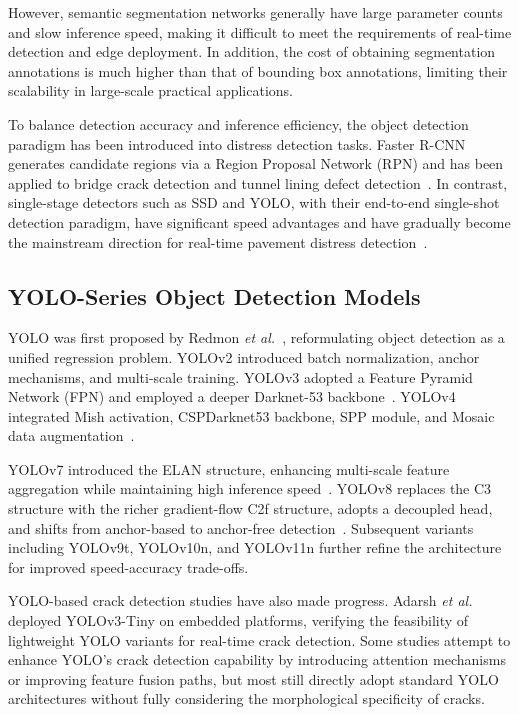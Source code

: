 \documentclass{ieeeaccess}
\begin{document}
{However, semantic segmentation networks generally have large parameter counts and slow inference speed, making it difficult to meet the requirements of real-time detection and edge deployment. In addition, the cost of obtaining segmentation annotations is much higher than that of bounding box annotations, limiting their scalability in large-scale practical applications.

To balance detection accuracy and inference efficiency, the object detection paradigm has been introduced into distress detection tasks. Faster R-CNN~\cite{Ren2016} generates candidate regions via a Region Proposal Network (RPN) and has been applied to bridge crack detection and tunnel lining defect detection~\cite{Li2021}. In contrast, single-stage detectors such as SSD and YOLO, with their end-to-end single-shot detection paradigm, have significant speed advantages and have gradually become the mainstream direction for real-time pavement distress detection~\cite{Murillo2013, Wang2024}.

\subsection{YOLO-Series Object Detection Models}

YOLO was first proposed by Redmon \textit{et al.}~\cite{Redmon2016}, reformulating object detection as a unified regression problem. YOLOv2 introduced batch normalization, anchor mechanisms, and multi-scale training. YOLOv3 adopted a Feature Pyramid Network (FPN) and employed a deeper Darknet-53 backbone~\cite{Farhadi2018}. YOLOv4 integrated Mish activation, CSPDarknet53 backbone, SPP module, and Mosaic data augmentation~\cite{Bochkovskiy2020}.

YOLOv7 introduced the ELAN structure, enhancing multi-scale feature aggregation while maintaining high inference speed~\cite{Wang2023}. YOLOv8 replaces the C3 structure with the richer gradient-flow C2f structure, adopts a decoupled head, and shifts from anchor-based to anchor-free detection~\cite{Jocher2023}. Subsequent variants including YOLOv9t, YOLOv10n, and YOLOv11n further refine the architecture for improved speed-accuracy trade-offs.

YOLO-based crack detection studies have also made progress. Adarsh \textit{et al.}~\cite{Adarsh2020} deployed YOLOv3-Tiny on embedded platforms, verifying the feasibility of lightweight YOLO variants for real-time crack detection. Some studies attempt to enhance YOLO's crack detection capability by introducing attention mechanisms or improving feature fusion paths, but most still directly adopt standard YOLO architectures without fully considering the morphological specificity of cracks.

}
\end{document}
